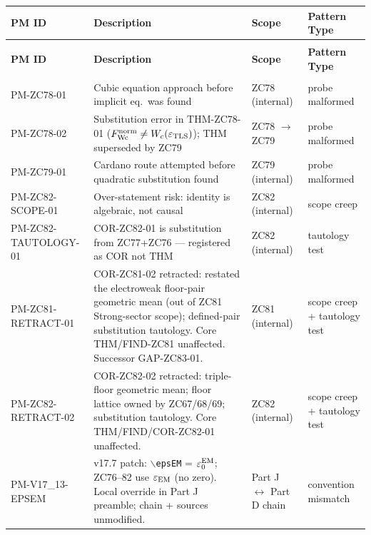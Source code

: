 \documentclass[12pt, a4paper]{article}
\begin{document}
\begin{formalbox}[title={Cross-Part PM Registry --- v17.13 Delta
  (Part J additions)}]
\small
\renewcommand{\arraystretch}{1.30}
\begin{longtable}{>{\raggedright\arraybackslash}p{4.0cm}
                  >{\raggedright\arraybackslash}p{4.0cm}
                  >{\centering\arraybackslash}p{2.2cm}
                  >{\raggedright\arraybackslash}p{3.8cm}}
\toprule
\textbf{PM ID} & \textbf{Description} & \textbf{Scope} & \textbf{Pattern Type} \\
\midrule
\endfirsthead
\multicolumn{4}{l}{\small\textit{(continued)}}\\[4pt]
\toprule\textbf{PM ID}&\textbf{Description}&\textbf{Scope}&\textbf{Pattern Type}\\\midrule
\endhead
\midrule\multicolumn{4}{r}{\small\textit{(continues)}}\\
\endfoot
\bottomrule
\endlastfoot
PM-ZC78-01
  & Cubic equation approach before implicit eq.\ was found
  & ZC78 (internal)
  & probe malformed \\[4pt]
PM-ZC78-02
  & Substitution error in THM-ZC78-01
    ($F_{\rm Wc}^{\rm norm} \neq W_c(\varepsilon_{\rm TLS})$);
    THM superseded by ZC79
  & ZC78 $\to$ ZC79
  & probe malformed \\[4pt]
PM-ZC79-01
  & Cardano route attempted before quadratic substitution found
  & ZC79 (internal)
  & probe malformed \\[4pt]
PM-ZC82-SCOPE-01
  & Over-statement risk: identity is algebraic, not causal
  & ZC82 (internal)
  & scope creep \\[4pt]
PM-ZC82-TAUTOLOGY-01
  & COR-ZC82-01 is substitution from ZC77+ZC76 — registered
    as COR not THM
  & ZC82 (internal)
  & tautology test \\[4pt]
PM-ZC81-RETRACT-01
  & COR-ZC81-02 retracted: restated the electroweak floor-pair
    geometric mean (out of ZC81 Strong-sector scope); defined-pair
    substitution tautology. Core THM/FIND-ZC81 unaffected.
    Successor GAP-ZC83-01.
  & ZC81 (internal)
  & scope creep + tautology test \\[4pt]
PM-ZC82-RETRACT-02
  & COR-ZC82-02 retracted: triple-floor geometric mean; floor
    lattice owned by ZC67/68/69; substitution tautology. Core
    THM/FIND/COR-ZC82-01 unaffected.
  & ZC82 (internal)
  & scope creep + tautology test \\[4pt]
PM-V17\_13-EPSEM
  & v17.7 patch: $\backslash$\texttt{epsEM} = $\varepsilon_0^{\rm EM}$;
    ZC76--82 use $\varepsilon_{\rm EM}$ (no zero). Local override in Part J
    preamble; chain + sources unmodified.
  & Part J $\leftrightarrow$ Part D chain
  & convention mismatch \\[4pt]
\bottomrule
\end{longtable}
\end{formalbox}
\end{document}
